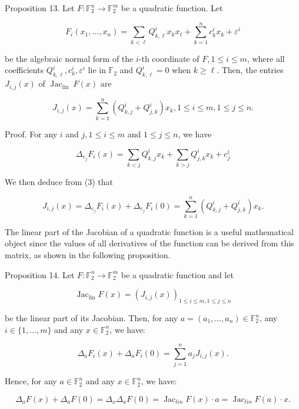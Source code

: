 \documentclass[10pt]{article}
\begin{document}
Proposition 13. Let $F: \mathbb{F}_{2}^{n} \rightarrow \mathbb{F}_{2}^{m}$ be a quadratic function. Let

$$
F_{i}\left(x_{1}, \ldots, x_{n}\right)=\sum_{k<\ell} Q_{k, \ell}^{i} x_{k} x_{\ell}+\sum_{k=1}^{n} c_{k}^{i} x_{k}+\varepsilon^{i}
$$

be the algebraic normal form of the $i$-th coordinate of $F, 1 \leqslant i \leqslant m$, where all coefficients $Q_{k, \ell}^{i}, c_{k}^{i}, \varepsilon^{i}$ lie in $\mathbb{F}_{2}$ and $Q_{k, \ell}^{i}=0$ when $k \geqslant \ell$. Then, the entries $J_{i, j}(x)$ of $\operatorname{Jac}_{\text {lin }} F(x)$ are

$$
J_{i, j}(x)=\sum_{k=1}^{n}\left(Q_{k, j}^{i}+Q_{j, k}^{i}\right) x_{k}, 1 \leqslant i \leqslant m, 1 \leqslant j \leqslant n .
$$

Proof. For any $i$ and $j, 1 \leqslant i \leqslant m$ and $1 \leqslant j \leqslant n$, we have

$$
\Delta_{e_{j}} F_{i}(x)=\sum_{k<j} Q_{k, j}^{i} x_{k}+\sum_{k>j} Q_{j, k}^{i} x_{k}+c_{j}^{i}
$$

We then deduce from (3) that

$$
J_{i, j}(x)=\Delta_{e_{j}} F_{i}(x)+\Delta_{e_{j}} F_{i}(0)=\sum_{k=1}^{n}\left(Q_{k, j}^{i}+Q_{j, k}^{i}\right) x_{k} .
$$

The linear part of the Jacobian of a quadratic function is a useful mathematical object since the values of all derivatives of the function can be derived from this matrix, as shown in the following proposition.

Proposition 14. Let $F: \mathbb{F}_{2}^{n} \rightarrow \mathbb{F}_{2}^{m}$ be a quadratic function and let

$$
\operatorname{Jac}_{\operatorname{lin}} F(x)=\left(J_{i, j}(x)\right)_{1 \leqslant i \leqslant m, 1 \leqslant j \leqslant n}
$$

be the linear part of its Jacobian. Then, for any $a=\left(a_{1}, \ldots, a_{n}\right) \in \mathbb{F}_{2}^{n}$, any $i \in\{1, \ldots, m\}$ and any $x \in \mathbb{F}_{2}^{n}$, we have:

$$
\Delta_{a} F_{i}(x)+\Delta_{a} F_{i}(0)=\sum_{j=1}^{n} a_{j} J_{i, j}(x) .
$$

Hence, for any $a \in \mathbb{F}_{2}^{n}$ and any $x \in \mathbb{F}_{2}^{n}$, we have:

$$
\Delta_{a} F(x)+\Delta_{a} F(0)=\Delta_{x} \Delta_{a} F(0)=\operatorname{Jac}_{l i n} F(x) \cdot a=\operatorname{Jac}_{l i n} F(a) \cdot x .
$$
\end{document}
